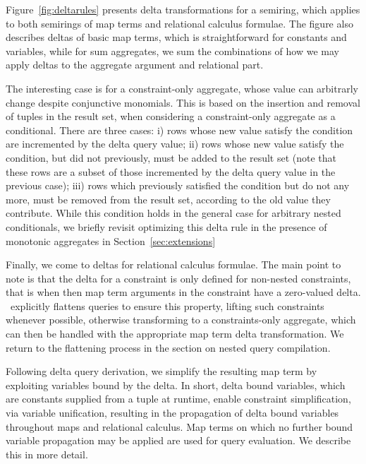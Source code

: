 Figure~\ref{fig:deltarules} presents delta transformations for a semiring, which
applies to both semirings of map terms and relational calculus formulae. The
figure also describes deltas of basic map terms, which is straightforward for
constants and variables, while for sum aggregates, we sum the combinations of
how we may apply deltas to the aggregate argument and relational part.

The interesting case is for a constraint-only aggregate, whose value can
arbitrarly change despite conjunctive monomials. This is based on the insertion
and removal of tuples in the result set, when considering a constraint-only
aggregate as a conditional. There are three cases:
i) rows whose new value satisfy the condition are
  incremented by the delta query value;
ii) rows whose new value satisfy the condition, but did not previously, must
  be added to the result set (note that these rows are a subset of those
  incremented by the delta query value in the previous case);
iii) rows which previously satisfied the condition but do not any more, must be
  removed from the result set, according to the old value they contribute.
While this condition holds in the general case for arbitrary nested
conditionals, we briefly revisit optimizing this delta rule in the presence of
monotonic aggregates in Section~\ref{sec:extensions}

Finally, we come to deltas for relational calculus formulae. The main point to
note is that the delta for a constraint is only defined for non-nested
constraints, that is when then map term arguments in the constraint have a
zero-valued delta. \compiler\ explicitly flattens queries to ensure this
property, lifting such constraints whenever possible, otherwise transforming to
a constraints-only aggregate, which can then be handled with the appropriate map
term delta transformation. We return to the flattening process in the section on
nested query compilation.


Following delta query derivation, we simplify the resulting map term by
exploiting variables bound by the delta. In short, delta bound variables, which
are constants supplied from a tuple at runtime, enable constraint
simplification, via variable unification, resulting in the propagation of delta
bound variables throughout maps and relational calculus. Map terms on which no
further bound variable propagation may be applied are used for query
evaluation. We describe this in more detail.

